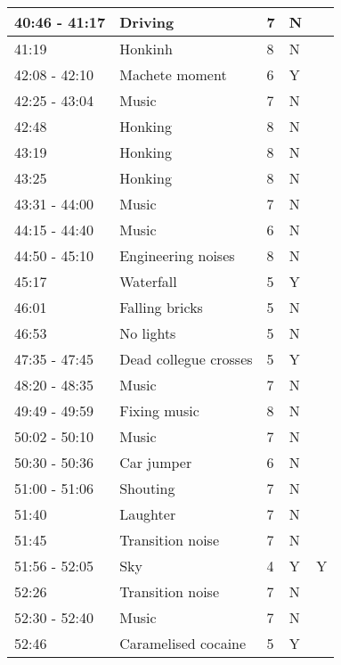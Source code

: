 \begin{longtable}{| p{70pt} | p{130pt} | p{45pt} | p{57pt} | p{60pt}|}
40:46 - 41:17     &     Driving     &     7     &     N& \\\hline
41:19     &     Honkinh     &     8     &     N& \\\hline
42:08 - 42:10     &     Machete moment     &     6     &     Y& \\\hline
42:25 - 43:04     &     Music     &     7     &     N& \\\hline
42:48     &     Honking     &     8     &     N& \\\hline
43:19     &     Honking     &     8     &     N& \\\hline
43:25     &     Honking     &     8     &     N& \\\hline
43:31 - 44:00     &     Music     &     7     &     N& \\\hline
44:15 - 44:40     &     Music     &     6     &     N& \\\hline
44:50 - 45:10     &     Engineering noises     &     8     &     N& \\\hline
45:17     &     Waterfall     &     5     &     Y& \\\hline
46:01     &     Falling bricks     &     5     &     N& \\\hline
46:53     &     No lights     &     5     &     N& \\\hline
47:35 - 47:45     &     Dead collegue crosses     &     5     &     Y& \\\hline
48:20 - 48:35     &     Music     &     7     &     N& \\\hline
49:49 - 49:59     &     Fixing music     &     8     &     N& \\\hline
50:02 - 50:10     &     Music     &     7     &     N& \\\hline
50:30 - 50:36     &     Car jumper     &     6     &     N& \\\hline
51:00 - 51:06     &     Shouting     &     7     &     N& \\\hline
51:40     &     Laughter     &     7     &     N& \\\hline
51:45     &     Transition noise     &     7     &     N& \\\hline
51:56 - 52:05     &     Sky     &     4     &     Y&Y \\\hline
52:26     &     Transition noise     &     7     &     N& \\\hline
52:30 - 52:40     &     Music     &     7     &     N& \\\hline
52:46     &     Caramelised cocaine     &     5     &     Y& \\\hline

\end{longtable}
